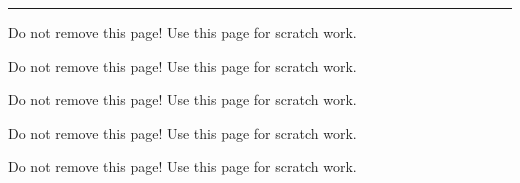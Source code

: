 \documentclass[12pt,addpoints]{exam}
\begin{document}
\begin{center}
    \pointtable[v][questions]
\end{center}

\noindent
\rule[2ex]{\textwidth}{2pt}
\clearpage


\clearpage
\begin{questions}
% 
% 

\clearpage
% 

\clearpage

\clearpage

\clearpage

\clearpage

\clearpage

\clearpage

\clearpage

\clearpage
\end{questions}

\clearpage
\begin{center}
Do not remove this page! Use this page for scratch work.
\end{center}
\clearpage
\begin{center}
Do not remove this page! Use this page for scratch work.
\end{center}
\clearpage
\begin{center}
Do not remove this page! Use this page for scratch work.
\end{center}
\clearpage
\begin{center}
Do not remove this page! Use this page for scratch work.
\end{center}
\clearpage
\begin{center}
Do not remove this page! Use this page for scratch work.
\end{center}
\end{document}
